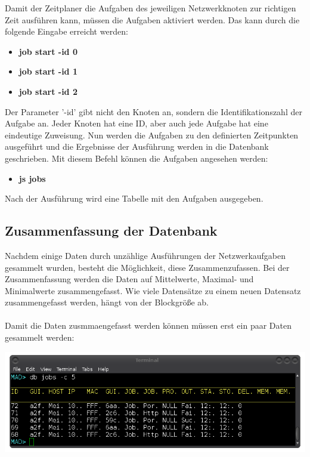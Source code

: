 \documentclass[12pt,a4paper]{report}
\begin{document}
\begin{onehalfspace}
Damit der Zeitplaner die Aufgaben des jeweiligen Netzwerkknoten zur richtigen Zeit ausführen kann, müssen die Aufgaben aktiviert werden. Das kann durch die folgende Eingabe erreicht werden:\\

\begin{itemize}
\item \textbf{job start -id 0}
\item \textbf{job start -id 1}
\item \textbf{job start -id 2}
\end{itemize}

Der Parameter '-id' gibt nicht den Knoten an, sondern die Identifikationszahl der Aufgabe an. Jeder Knoten hat eine ID, aber auch jede Aufgabe hat eine eindeutige Zuweisung. Nun werden die Aufgaben zu den definierten Zeitpunkten ausgeführt und die Ergebnisse der Ausführung werden in die Datenbank geschrieben. Mit diesem Befehl können die Aufgaben angesehen werden: \\

\begin{itemize}
\item \textbf{js jobs}
\end{itemize}

Nach der Ausführung wird eine Tabelle mit den Aufgaben ausgegeben.

\subsection{Zusammenfassung der Datenbank}

Nachdem einige Daten durch unzählige Ausführungen der Netzwerkaufgaben gesammelt wurden, besteht die Möglichkeit, diese Zusammenzufassen. Bei der Zusammenfassung werden die Daten auf Mittelwerte, Maximal- und Minimalwerte zusammengefasst. Wie viele Datensätze zu einem neuen Datensatz zusammengefasst werden, hängt von der Blockgröße ab.\\\\
Damit die Daten zusmmaengefasst werden können müssen erst ein paar Daten gesammelt werden:

\begin{center}
\includegraphics[scale=0.6]{img/db_jobs2.png}
\end{center}


\end{onehalfspace}
\end{document}

